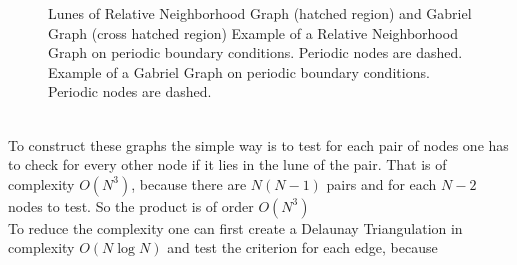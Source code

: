     \begin{figure}[htbp]
        \centering
        \caption[Gabriel - and Relative Neighborhood Graph]
        {
             Lunes of Relative Neighborhood
                Graph (hatched region) and
                Gabriel Graph (cross hatched region)
             Example of a Relative
                Neighborhood Graph on periodic boundary conditions.
                Periodic nodes are dashed.
             Example of a Gabriel Graph on
                periodic boundary conditions. Periodic nodes are
                dashed.
        }
        \label{fig:lunes}
    \end{figure}\\
    To construct these graphs the simple way is to test for each
    pair of nodes one has to check for every other node if it lies in
    the lune of the pair. That is of complexity \(O (N^3)\), because
    there are \(N(N-1)\) pairs and for each \(N-2\) nodes to test. So
    the product is of order \(O(N^3)\)\\
    To reduce the complexity one can first create a Delaunay
    Triangulation in complexity \(O (N \log N)\)
    \cite{Leach1992} and test the criterion for each edge, because
